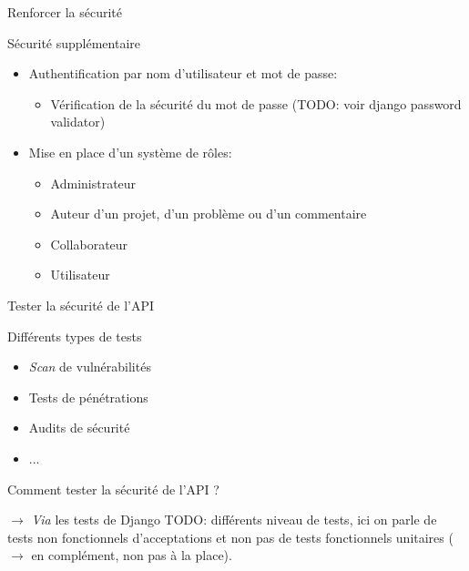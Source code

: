 \begin{frame}{Renforcer la sécurité}
  \begin{block}{Sécurité supplémentaire}
    \begin{itemize}
    \item Authentification par nom d'utilisateur et mot de passe:
      \begin{itemize}
      \item Vérification de la sécurité du mot de passe (TODO: voir django password validator)
      \end{itemize}
    \item Mise en place d'un système de rôles:
      \begin{itemize}
      \item Administrateur
      \item Auteur d'un projet, d'un problème ou d'un commentaire
      \item Collaborateur
      \item Utilisateur
      \end{itemize}
    \end{itemize}
  \end{block}
\end{frame}

\begin{frame}{Tester la sécurité de l'API}
  \begin{block}{Différents types de tests}
    \begin{itemize}
    \item \textit{Scan} de vulnérabilités
    \item Tests de pénétrations
    \item Audits de sécurité
    \item ...
    \end{itemize}

    Comment tester la sécurité de l'API ?
  \end{block}

  \begin{block}{$\rightarrow$ \textit{Via} les tests de Django}
    TODO: différents niveau de tests, ici on parle de tests non fonctionnels d'acceptations
    et non pas de tests fonctionnels unitaires ($\rightarrow$ en complément, non pas à la place).
  \end{block}
\end{frame}

